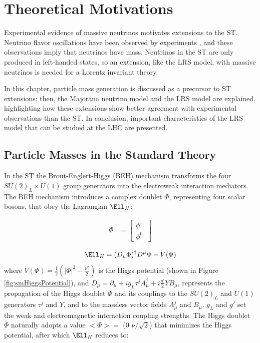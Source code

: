 \chapter{Theoretical Motivations}
\label{wrBosonAndHeavyNu}
Experimental evidence of massive neutrinos motivates extensions to the ST.  Neutrino flavor oscillations have 
been observed by experiments \cite{kamiokandeTwo,solarNuSummary,NOvAresults,mainzPhaseIIResults,t2kResults,dayaBayResults}, 
and these observations imply that neutrinos have mass.  Neutrinos in the ST are only produced in left-handed 
states, so an extension, like the LRS model, with massive neutrinos is needed for a Lorentz invariant theory.

In this chapter, particle mass generation is discussed as a precursor to ST extensions; 
then, the Majorana neutrino model and the LRS model are explained, highlighting how these extensions 
show better agreement with experimental observations than the ST.  In conclusion, 
important characteristics of the LRS model that can be studied at the LHC are presented.


\section{Particle Masses in the Standard Theory}
\label{sec:massInSM}
In the ST the Brout-Englert-Higgs (BEH) mechanism transforms the four $SU(2)_{L} \times U(1)$ group 
generators into the electroweak interaction mediators.  The BEH mechanism 
introduces a complex doublet $\Phi$, representing four scalar bosons, that obey the Lagrangian $\Ell_{H}$:

\begin{align}
	\Phi &= \begin{bmatrix}
	\phi^{+} \\
	\phi^{0}
	\end{bmatrix}
\end{align}

\begin{equation}
	\Ell_{H} = (D_{\mu}\Phi)^{\dagger}D^{\mu}\Phi - V(\Phi)
\end{equation}
where $V(\Phi) = \frac{1}{2}(|\Phi|^{2} - \frac{\nu^{2}}{2})$ is the Higgs potential (shown in Figure \ref{fig:smHiggsPotential}), and 
$D_{\mu} = \partial_{\mu} + ig_{L}\tau^{j}A^{j}_{\mu} + i\frac{g'}{2}YB_{\mu}$, represents the propagation 
of the Higgs doublet $\Phi$ and its couplings to the $SU(2)_{L}$ and $U(1)$ generators $\tau^{j}$ and $Y$, 
and to the massless vector fields $A^{j}_{\mu}$ and $B_{\mu}$.  $g_{L}$ and 
$g'$ set the weak and electromagnetic interaction coupling strengths.  The Higgs doublet $\Phi$ naturally 
adopts a value $<\Phi> =$ (0  $\nu/\sqrt{2}$) that minimizes the Higgs potential, after which $\Ell_{H}$ reduces 
to:

